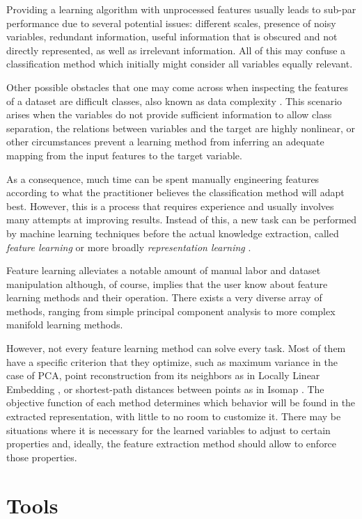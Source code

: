 Providing a learning algorithm with unprocessed features usually leads to sub-par performance due to several potential issues: different scales, presence of noisy variables, redundant information, useful information that is obscured and not directly represented, as well as irrelevant information. All of this may confuse a classification method which initially might consider all variables equally relevant.

Other possible obstacles that one may come across when inspecting the features of a dataset are difficult classes, also known as data complexity . This scenario arises when the variables do not provide sufficient information to allow class separation, the relations between variables and the target are highly nonlinear, or other circumstances prevent a learning method from inferring an adequate mapping from the input features to the target variable.

As a consequence, much time can be spent manually engineering features according to what the practitioner believes the classification method will adapt best. However, this is a process that requires experience and usually involves many attempts at improving results. Instead of this, a new task can be performed by machine learning techniques before the actual knowledge extraction, called \textit{feature learning} or more broadly \textit{representation learning} . 

Feature learning alleviates a notable amount of manual labor and dataset manipulation although, of course, implies that the user know about feature learning methods and their operation. There exists a very diverse array of methods, ranging from simple principal component analysis to more complex manifold learning methods.

However, not every feature learning method can solve every task. Most of them have a specific criterion that they optimize, such as maximum variance in the case of PCA, point reconstruction from its neighbors as in Locally Linear Embedding , or shortest-path distances between points as in Isomap . The objective function of each method determines which behavior will be found in the extracted representation, with little to no room to customize it. There may be situations where it is necessary for the learned variables to adjust to certain properties and, ideally, the feature extraction method should allow to enforce those properties.

\section{Tools}

